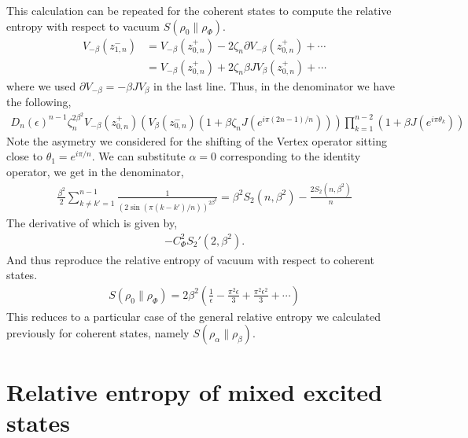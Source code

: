 \documentclass[11pt]{article}
\newcommand{\ep}{\epsilon}
\newcommand{\p}{\partial}
\newcommand{\lb}{\left(}
\newcommand{\rb}{\right)}
\begin{document}
This calculation can be repeated for the coherent states to compute the relative entropy with respect to vacuum $S(\rho_0 \| \rho_\Phi)$.
\begin{align}
    V_{-\beta}(z_{1,n}^-) &= V_{-\beta}(z_{0,n}^+) - 2\zeta_n\p V_{-\beta}(z_{0,n}^+) + \cdots \\
    &=V_{-\beta}(z_{0,n}^+) + 2\zeta_n \beta J  V_\beta(z_{0,n}^+) + \cdots
\end{align}
where we used $\p V_{-\beta} = -\beta J V_\beta$ in the last line. 
Thus, in the denominator we have the following,
\begin{align}
    D_n(\ep)^{n-1} \zeta_n^{2\beta^2} V_{-\beta}(z_{0,n}^+)\lb V_\beta(z_{0,n}^-) (1+\beta \zeta_nJ(e^{i\pi (2n-1)/n}))\rb \prod_{k=1}^{n-2}(1+\beta J(e^{i\pi \theta_k}))
\end{align}
Note the asymetry we considered for the shifting of the Vertex operator sitting close to $\theta_1 = e^{i\pi/n}$.
We can substitute $\alpha = 0$ corresponding to the identity operator, we get in the denominator,
\begin{align}
    \frac{\beta^2}{2}\sum_{k\neq k'=1}^{n-1}\frac{1}{(2\sin(\pi(k-k')/n))^{2\beta^2}} = \beta^2 S_2(n,\beta^2) - \frac{2S_2(n,\beta^2)}{n}
\end{align}
The derivative of which is given by,
\begin{align}
    -C_\Phi^2 S_2'(2,\beta^2).
\end{align}
And thus reproduce the relative entropy of vacuum with respect to coherent states. 
\begin{align}
    S(\rho_0 \| \rho_\Phi) = 2\beta^2\lb \frac{1}{\ep} - \frac{\pi^2\ep}{3} + \frac{\pi^2\ep^2}{3} + \cdots \rb
\end{align}
This reduces to a particular case of the general relative entropy we calculated previously for coherent states, namely $S(\rho_\alpha \| \rho_\beta)$. 


  \section{Relative entropy of mixed excited states}
\end{document}
